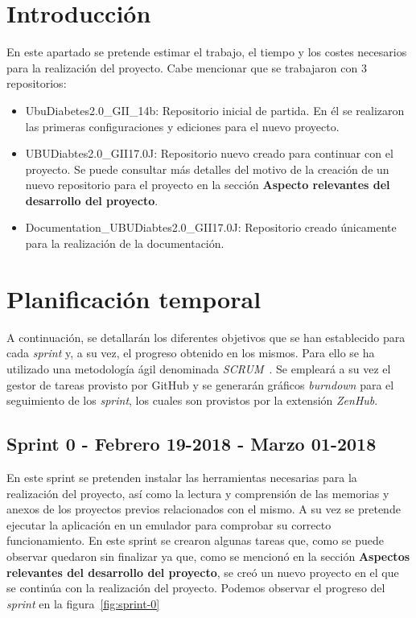 
\section{Introducción}
En este apartado se pretende estimar el trabajo, el tiempo y los costes necesarios para la realización del proyecto.
Cabe mencionar que se trabajaron con 3 repositorios:
\begin{itemize}
	\item UbuDiabetes2.0\_GII\_14b: Repositorio inicial de partida. En él se realizaron las primeras configuraciones y ediciones para el nuevo proyecto.
	\item UBUDiabtes2.0\_GII17.0J: Repositorio nuevo creado para continuar con el proyecto. Se puede consultar más detalles del motivo de la creación de un nuevo repositorio para el proyecto en la sección \textbf{Aspecto relevantes del desarrollo del proyecto}.
	\item Documentation\_UBUDiabtes2.0\_GII17.0J: Repositorio creado únicamente para la realización de la documentación.
\end{itemize}



\section{Planificación temporal}
A continuación, se detallarán los diferentes objetivos que se han establecido para cada \textit{sprint} y, a su vez, el progreso obtenido en los mismos. Para ello se ha utilizado una metodología ágil denominada \textit{SCRUM}~\cite{schwaber2002agile}. Se empleará a su vez el gestor de tareas provisto por GitHub y se generarán gráficos \textit{burndown} para el seguimiento de los \textit{sprint}, los cuales son provistos por la extensión \textit{ZenHub}.
\subsection{Sprint 0 - Febrero 19-2018 - Marzo 01-2018}
En este sprint se pretenden instalar las herramientas necesarias para la realización del proyecto, así como la lectura y comprensión de las memorias y anexos de los proyectos previos relacionados con el mismo. A su vez se pretende ejecutar la aplicación en un emulador para comprobar su correcto funcionamiento.
En este sprint se crearon algunas tareas que, como se puede observar quedaron sin finalizar ya que, como se mencionó en la sección \textbf{Aspectos relevantes del desarrollo del proyecto}, se creó un nuevo proyecto en el que se continúa con la realización del proyecto.
Podemos observar el progreso del \textit{sprint} en la figura~\ref{fig:sprint-0}
